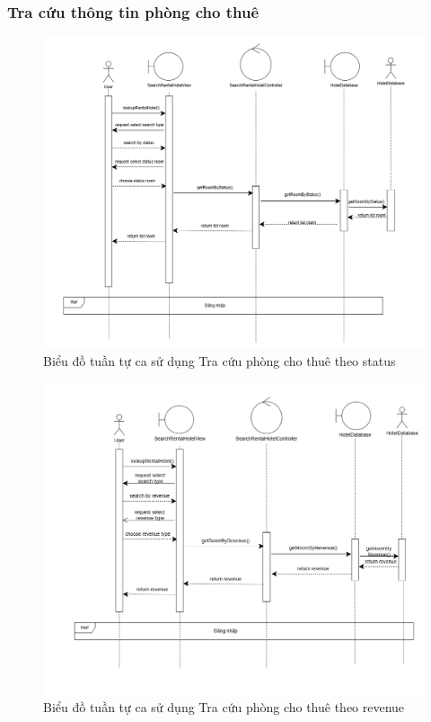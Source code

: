 \subsubsection{Tra cứu thông tin phòng cho thuê}
\begin{figure}[H]
    \centering
    \includegraphics[width=\textwidth]{img2/tracuutrangthaiphongpt.png}
    \caption{Biểu đồ tuần tự ca sử dụng Tra cứu phòng cho thuê theo status}
\end{figure}

\begin{figure}[H]
    \centering
    \includegraphics[width=\textwidth]{img2/tracuutheodoanhthupt.png}
    \caption{Biểu đồ tuần tự ca sử dụng Tra cứu phòng cho thuê theo revenue}
\end{figure}

